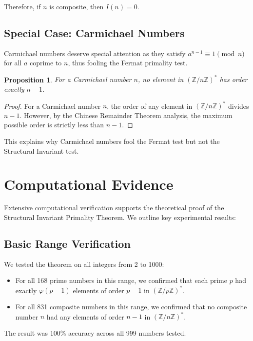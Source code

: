 \documentclass[11pt,a4paper]{article}
\newtheorem{proposition}[theorem]{Proposition}
\newcommand{\Z}{\mathbb{Z}}
\newcommand{\ZnZstar}[1]{(\Z/{#1}\Z)^{*}}
\newcommand{\totient}{\varphi}
\newcommand{\structinv}{I}
\begin{document}
Therefore, if $n$ is composite, then $\structinv(n) = 0$.

\subsection{Special Case: Carmichael Numbers}

Carmichael numbers deserve special attention as they satisfy $a^{n-1} \equiv 1 \pmod{n}$ for all $a$ coprime to $n$, thus fooling the Fermat primality test.

\begin{proposition}
For a Carmichael number $n$, no element in $\ZnZstar{n}$ has order exactly $n-1$.
\end{proposition}

\begin{proof}
For a Carmichael number $n$, the order of any element in $\ZnZstar{n}$ divides $n-1$. However, by the Chinese Remainder Theorem analysis, the maximum possible order is strictly less than $n-1$.
\end{proof}

This explains why Carmichael numbers fool the Fermat test but not the Structural Invariant test.

\section{Computational Evidence}

Extensive computational verification supports the theoretical proof of the Structural Invariant Primality Theorem. We outline key experimental results:

\subsection{Basic Range Verification}

We tested the theorem on all integers from 2 to 1000:

\begin{itemize}
    \item For all 168 prime numbers in this range, we confirmed that each prime $p$ had exactly $\totient(p-1)$ elements of order $p-1$ in $\ZnZstar{p}$.
    \item For all 831 composite numbers in this range, we confirmed that no composite number $n$ had any elements of order $n-1$ in $\ZnZstar{n}$.
\end{itemize}

The result was 100\% accuracy across all 999 numbers tested.
\end{document}
